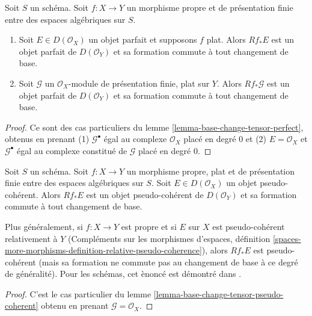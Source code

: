 \begin{lemma}
\label{lemma-flat-proper-perfect-direct-image-general}
Soit $S$ un schéma. Soit $f : X \to Y$ un morphisme propre
et de présentation finie entre des espaces algébriques sur $S$.
\begin{enumerate}
\item Soit $E \in D(\mathcal{O}_X)$ un objet parfait et supposons $f$ plat.
Alors
$Rf_*E$ est un objet parfait de $D(\mathcal{O}_Y)$ et sa formation
commute à tout changement de base.
\item Soit $\mathcal{G}$ un $\mathcal{O}_X$-module de présentation finie,
plat sur $Y$. Alors $Rf_*\mathcal{G}$ est un objet parfait de
$D(\mathcal{O}_Y)$ et sa formation commute à tout changement de base.
\end{enumerate}
\end{lemma}

\begin{proof}
Ce sont des cas particuliers du
lemme \ref{lemma-base-change-tensor-perfect}, obtenus en prenant
(1) $\mathcal{G}^\bullet$ égal au complexe $\mathcal{O}_X$ placé en degré $0$
et (2) $E = \mathcal{O}_X$ et $\mathcal{G}^\bullet$ égal au complexe constitué
de $\mathcal{G}$ placé en degré $0$.
\end{proof}

\begin{lemma}
\label{lemma-flat-proper-pseudo-coherent-direct-image-general}
Soit $S$ un sch\'ema. Soit $f : X \to Y$ un morphisme propre, plat et
de pr\'esentation finie entre des espaces alg\'ebriques sur $S$.
Soit $E \in D(\mathcal{O}_X)$ un objet
pseudo-coh\'erent. Alors $Rf_*E$ est un objet pseudo-coh\'erent de
$D(\mathcal{O}_Y)$ et sa formation commute \`a tout changement de base.
\end{lemma}

\noindent
Plus g\'en\'eralement, si $f : X \to Y$ est propre et si $E$ sur $X$ est
pseudo-coh\'erent relativement \`a $Y$ (Compl\'ements sur les morphismes d'espaces, d\'efinition
\ref{spaces-more-morphisms-definition-relative-pseudo-coherence}),
alors $Rf_*E$ est pseudo-coh\'erent
(mais sa formation ne commute pas au changement de base \`a ce degr\'e de g\'en\'eralit\'e).
Pour les sch\'emas, cet \`enonc\'e est d\'emontr\'e dans \cite{Kiehl}.

\begin{proof}
C'est le cas particulier du
lemme \ref{lemma-base-change-tensor-pseudo-coherent} obtenu en prenant
$\mathcal{G} = \mathcal{O}_X$.
\end{proof}

